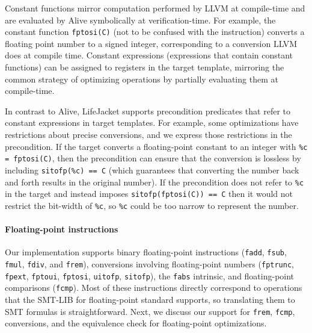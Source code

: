 \documentclass[preprint, numbers]{sigplanconf}
\newcommand{\xxx}{LifeJacket}
\begin{document}
Constant functions mirror computation performed by LLVM at compile-time and are
evaluated by Alive symbolically at verification-time.  For example, the
constant function \texttt{fptosi(C)} (not to be confused with the instruction)
converts a floating point number to a signed integer, corresponding to a
conversion LLVM does at compile time. Constant expressions (expressions that
contain constant functions) can be assigned to registers in the target
template, mirroring the common strategy of optimizing operations by partially
evaluating them at compile-time.

In contrast to Alive, \xxx{} supports precondition predicates that refer to
constant expressions in target templates. For example, some optimizations have
restrictions about precise conversions, and we express those restrictions in
the precondition. If the target converts a floating-point constant to an
integer with \texttt{\%c = fptosi(C)}, then the precondition can ensure that
the conversion is lossless by including \texttt{sitofp(\%c) == C} (which
guarantees that converting the number back and forth results in the original
number).  If the precondition does not refer to \texttt{\%c} in the target and
instead imposes \texttt{sitofp(fptosi(C)) == C} then it would not restrict the
bit-width of \texttt{\%c}, so \texttt{\%c} could be too narrow to represent the
number.



\paragraph{Floating-point instructions}
Our implementation supports binary floating-point instructions (\texttt{fadd},
\texttt{fsub}, \texttt{fmul}, \texttt{fdiv}, and \texttt{frem}), conversions
involving floating-point numbers (\texttt{fptrunc}, \texttt{fpext},
\texttt{fptoui}, \texttt{fptosi}, \texttt{uitofp}, \texttt{sitofp}), the
\texttt{fabs} intrinsic, and floating-point comparisons (\texttt{fcmp}). Most
of these instructions directly correspond to operations
that the SMT-LIB for floating-point standard supports, so translating them to
SMT formulas is straightforward.  Next, we discuss our support for
\texttt{frem}, \texttt{fcmp}, conversions, and the equivalence check for
floating-point optimizations.
\end{document}
